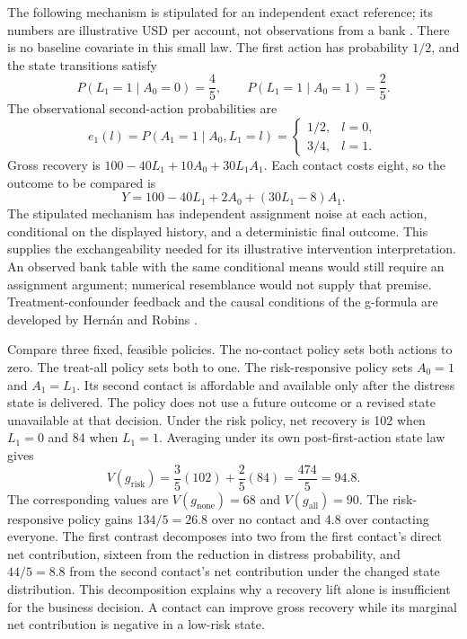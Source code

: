 The following mechanism is stipulated for an independent exact reference; its
numbers are illustrative USD per account, not observations from a bank
\cite{exec14_workflow_oracle}. There is no baseline covariate in this small law.
The first action has probability $1/2$, and the state transitions satisfy
\[
 P(L_1=1\mid A_0=0)=\frac45,\qquad
 P(L_1=1\mid A_0=1)=\frac25.
\]
The observational second-action probabilities are
\[
 e_1(l)=P(A_1=1\mid A_0,L_1=l)
 =\begin{cases}1/2,&l=0,\\3/4,&l=1.\end{cases}
\]
Gross recovery is $100-40L_1+10A_0+30L_1A_1$. Each contact costs eight, so the
outcome to be compared is
\[
 Y=100-40L_1+2A_0+(30L_1-8)A_1.
 \label{eq:exec14-l5-net}
\]
The stipulated mechanism has independent assignment noise at each action,
conditional on the displayed history, and a deterministic final outcome.
This supplies the exchangeability needed for its illustrative intervention
interpretation. An observed bank table with the same conditional means would
still require an assignment argument; numerical resemblance would not supply
that premise. Treatment-confounder feedback and the causal conditions of the
g-formula are developed by Hern\'an and Robins \cite{hernan2020}.

Compare three fixed, feasible policies. The no-contact policy sets both
actions to zero. The treat-all policy sets both to one. The risk-responsive
policy sets $A_0=1$ and $A_1=L_1$. Its second contact is affordable and available
only after the distress state is delivered. The policy does not use a future
outcome or a revised state unavailable at that decision. Under the risk policy,
net recovery is 102 when $L_1=0$ and 84 when $L_1=1$. Averaging under its own
post-first-action state law gives
\[
 V(g_{\mathrm{risk}})=\frac35(102)+\frac25(84)
 =\frac{474}{5}=94.8.
\]
The corresponding values are $V(g_{\mathrm{none}})=68$ and
$V(g_{\mathrm{all}})=90$. The risk-responsive policy gains
$134/5=26.8$ over no contact and 4.8 over contacting everyone. The first contrast
decomposes into two from the first contact's direct net contribution, sixteen
from the reduction in distress probability, and $44/5=8.8$ from the second
contact's net contribution under the changed state distribution. This
decomposition explains why a recovery lift alone is insufficient for the
business decision. A contact can improve gross recovery while its marginal
net contribution is negative in a low-risk state.

